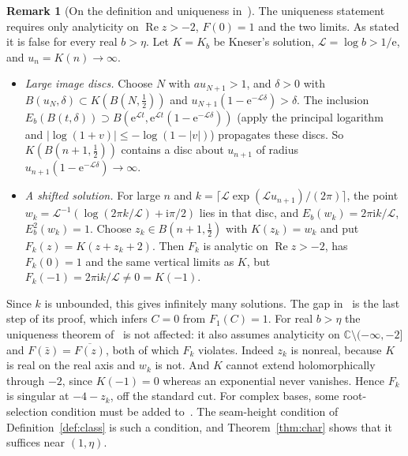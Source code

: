 \documentclass[11pt]{amsart}
\theoremstyle{definition}
\newtheorem{remark}[theorem]{Remark}
\newcommand{\eee}{\mathrm{e}}
\newcommand{\ii}{\mathrm{i}}
\begin{document}
\begin{remark}[On the definition and uniqueness in~\cite{Paulsen2019}]
The uniqueness statement~\cite[Prop.~2]{Paulsen2019} requires only
analyticity on $\operatorname{Re}z>-2$, $F(0)=1$ and the two limits.  As stated it is false for
every real $b>\eta$.  Let $K=K_b$ be Kneser's solution, $\mathcal L=\log b>1/\eee$, and
$u_n=K(n)\to\infty$.
\begin{itemize}
\item \emph{Large image discs.}  Choose $N$ with $au_{N+1}>1$, and $\delta>0$ with
  $B(u_N,\delta)\subset K(B(N,\tfrac12))$ and $u_{N+1}(1-\eee^{-\mathcal L\delta})>\delta$.  The inclusion
  $E_b(B(t,\delta))\supset B(\eee^{\mathcal Lt},\eee^{\mathcal Lt}(1-\eee^{-\mathcal L\delta}))$ (apply the principal logarithm and
  $|\log(1+v)|\le-\log(1-|v|)$) propagates these discs.  So $K(B(n+1,\tfrac12))$ contains a
  disc about $u_{n+1}$ of radius $u_{n+1}(1-\eee^{-\mathcal L\delta})\to\infty$.
\item \emph{A shifted solution.}  For large $n$ and $k=\lceil \mathcal L\exp(\mathcal Lu_{n+1})/(2\pi)\rceil$, the point
  $w_k=\mathcal L^{-1}(\log(2\pi k/\mathcal L)+\ii\pi/2)$ lies in that disc, and $E_b(w_k)=2\pi\ii k/\mathcal L$,
  $E_b^2(w_k)=1$.  Choose $z_k\in B(n+1,\tfrac12)$ with $K(z_k)=w_k$ and put
  $F_k(z)=K(z+z_k+2)$.  Then $F_k$ is analytic on $\operatorname{Re}z>-2$, has $F_k(0)=1$ and the
  same vertical limits as $K$, but $F_k(-1)=2\pi\ii k/\mathcal L\ne0=K(-1)$.
\end{itemize}
Since $k$ is unbounded, this gives infinitely many solutions.
The gap in~\cite[Prop.~2]{Paulsen2019} is the last step of its proof,
which infers $C=0$ from $F_1(C)=1$.  For real $b>\eta$ the uniqueness
theorem of~\cite{PaulsenCowgill2017} is not affected: it also assumes
analyticity on $\mathbb C\setminus(-\infty,-2]$ and $F(\bar z)=\overline{F(z)}$,
both of which $F_k$ violates.  Indeed $z_k$ is nonreal, because $K$ is real on
the real axis and $w_k$ is not.  And $K$ cannot extend holomorphically through
$-2$, since $K(-1)=0$ whereas an exponential never vanishes.  Hence $F_k$ is
singular at $-4-z_k$, off the standard cut.
For complex bases, some root-selection
condition must be added to~\cite[Prop.~2]{Paulsen2019}.  The seam-height
condition of Definition~\ref{def:class} is such a condition, and
Theorem~\ref{thm:char} shows that it suffices near $(1,\eta)$.


\end{remark}
\end{document}
